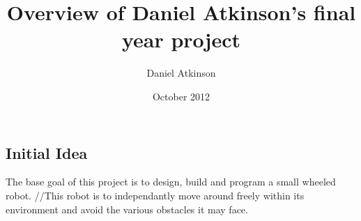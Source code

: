 \documentclass{article}
\title{Overview of Daniel Atkinson's final year project}
\author{Daniel Atkinson}
\date{October 2012}
\begin{document}
   \maketitle

\subsection*{Initial Idea}
The base goal of this project is to design, build and program a small wheeled robot.
//This robot is to independantly move around freely within its environment and avoid the various obstacles it may face.
\end{document}
